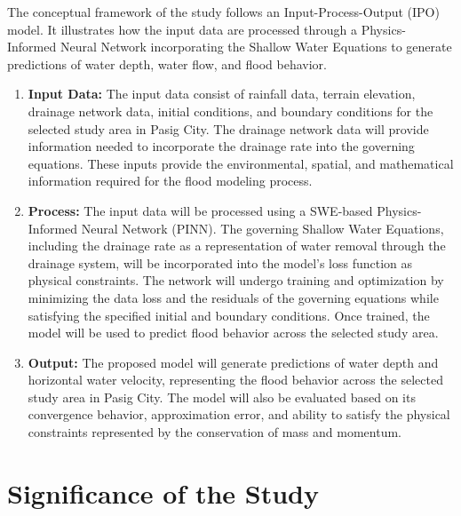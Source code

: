 The conceptual framework of the study follows an Input-Process-Output (IPO) model. It illustrates how the input data are processed through a Physics-Informed Neural Network incorporating the Shallow Water Equations to generate predictions of water depth, water flow, and flood behavior. 

\begin{enumerate}
    \item \textbf{Input Data:} The input data consist of rainfall data, terrain elevation, drainage network data, initial conditions, and boundary conditions for the selected study area in Pasig City. The drainage network data will provide information needed to incorporate the drainage rate into the governing equations. These inputs provide the environmental, spatial, and mathematical information required for the flood modeling process.

    \item \textbf{Process:} The input data will be processed using a SWE-based Physics-Informed Neural Network (PINN). The governing Shallow Water Equations, including the drainage rate as a representation of water removal through the drainage system, will be incorporated into the model's loss function as physical constraints. The network will undergo training and optimization by minimizing the data loss and the residuals of the governing equations while satisfying the specified initial and boundary conditions. Once trained, the model will be used to predict flood behavior across the selected study area.

    \item \textbf{Output:} The proposed model will generate predictions of water depth and horizontal water velocity, representing the flood behavior across the selected study area in Pasig City. The model will also be evaluated based on its convergence behavior, approximation error, and ability to satisfy the physical constraints represented by the conservation of mass and momentum.
\end{enumerate}

\section{Significance of the Study}


